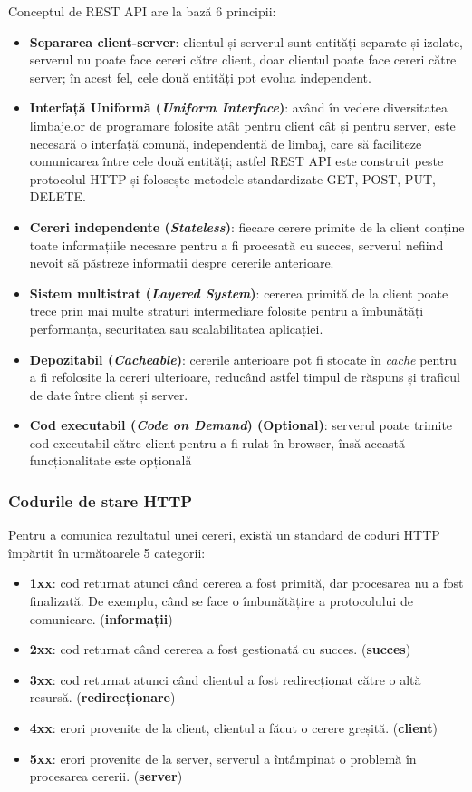 \par
Conceptul de REST API are la bază 6 principii:
\begin{itemize}
    \item \textbf{Separarea client-server}: clientul și serverul sunt entități separate și izolate,
    serverul nu poate face cereri către client, doar clientul poate face cereri către server; 
    în acest fel, cele două entități pot evolua independent.
    \item \textbf{Interfață Uniformă (\textit{Uniform Interface})}: având în vedere diversitatea limbajelor de programare folosite
    atât pentru client cât și pentru server, este necesară o interfață comună, independentă de limbaj,
    care să faciliteze comunicarea între cele două entități; astfel REST API este construit peste 
    protocolul HTTP și folosește metodele standardizate GET, POST, PUT, DELETE.
    \item \textbf{Cereri independente (\textit{Stateless})}: fiecare cerere primite de la client conține toate informațiile necesare
    pentru a fi procesată cu succes, serverul nefiind nevoit să păstreze informații despre cererile
    anterioare.
    \item \textbf{Sistem multistrat (\textit{Layered System})}: cererea primită de la client poate trece prin mai multe straturi
    intermediare folosite pentru a îmbunătăți performanța, securitatea sau scalabilitatea aplicației.
    \item \textbf{Depozitabil (\textit{Cacheable})}: cererile anterioare pot fi stocate în \textit{cache} pentru a fi refolosite
    la cereri ulterioare, reducând astfel timpul de răspuns și traficul de date între client și server.
    \item \textbf{Cod executabil (\textit{Code on Demand}) (Optional)}: serverul poate trimite cod executabil către client pentru
    a fi rulat în browser, însă această funcționalitate este opțională
\end{itemize}

\subsubsection{Codurile de stare HTTP}
Pentru a comunica rezultatul unei cereri, există un standard de coduri HTTP împărțit în
următoarele 5 categorii:
\begin{itemize}
    \item \textbf{1xx}: cod returnat atunci când cererea a fost primită, dar procesarea nu a fost finalizată. De exemplu, când se
    face o îmbunătățire a protocolului de comunicare. (\textbf{informații})
    \item \textbf{2xx}: cod returnat când cererea a fost gestionată cu succes. (\textbf{succes})
    \item \textbf{3xx}: cod returnat atunci când clientul a fost redirecționat către o altă resursă. (\textbf{redirecționare})
    \item \textbf{4xx}: erori provenite de la client, clientul a făcut o cerere greșită. (\textbf{client})
    \item \textbf{5xx}: erori provenite de la server, serverul a întâmpinat o problemă în procesarea cererii. (\textbf{server})
\end{itemize}

